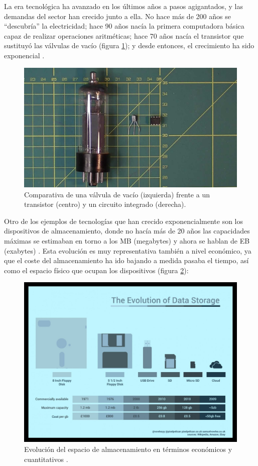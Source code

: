La era tecnológica ha avanzado en los últimos años a pasos agigantados, y las
demandas del sector han crecido junto a ella. No hace más de 200 años se ``descubría''
la electricidad; hace 90 años nacía la primera computadora básica capaz de realizar
operaciones aritméticas; hace 70 años nacía el transistor que sustituyó las
válvulas de vacío (figura \ref{fig:transistor}); y desde entonces, el crecimiento
ha sido exponencial \cite{HistoryTechnologyTimeline}.

\begin{figure}[H]
    \centering
    \includegraphics[width=.7\linewidth]{pictures/transistor-vs-valve.jpg}
    \caption{Comparativa de una válvula de vacío (izquierda) frente a un transistor (centro) y un circuito integrado (derecha).}
    \label{fig:transistor}
\end{figure}

Otro de los ejemplos de tecnologías que han crecido exponencialmente son los dispositivos
de almacenamiento, donde no hacía más de 20 años las capacidades máximas se estimaban
en torno a los MB (megabytes) y ahora se hablan de EB (exabytes) \cite{EvolutionDataStorage}.
Esta evolución es muy representativa también a nivel económico, ya que el coste del
almacenamiento ha ido bajando a medida pasaba el tiempo, así como el espacio físico
que ocupan los dispositivos (figura \ref{fig:disk-evolution}):

\begin{figure}[H]
    \centering
    \includegraphics[width=.65\linewidth]{pictures/disk-evo.jpg}
    \caption{Evolución del espacio de almacenamiento en términos económicos y cuantitativos \cite{wecomputingtechStorageDevicesLondon}.}
    \label{fig:disk-evolution}
\end{figure}

